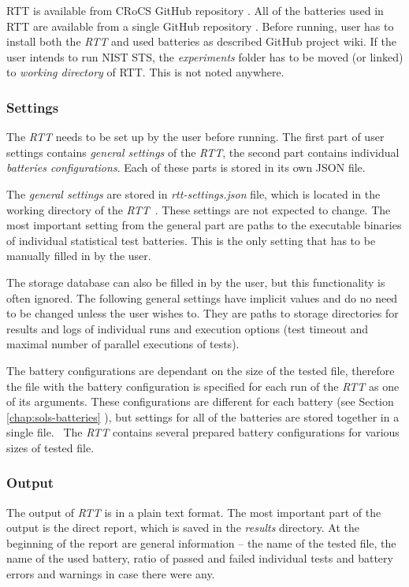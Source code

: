 \documentclass[
  digital,     %
  oneside,     %
  nosansbold,  %
  nocolorbold, %
  nolof,         %
  nolot,         %
]{fithesis4}
\begin{document}
RTT is available from CRoCS GitHub repository \cite{rtt-site}. All of the batteries used in RTT are available from a single GitHub repository \cite{rtt-batteries}. Before running, user has to install both the \emph{RTT} and used batteries as described GitHub project wiki. If the user intends to run NIST STS, the \emph{experiments} folder has to be moved (or linked) to \emph{working directory} of RTT. This is not noted anywhere.

\subsubsection{Settings}\label{rtt-settings} 
The \emph{RTT} needs to be set up by the user before running. The first part of user settings contains \emph{general settings} of the \emph{RTT}, the second part contains individual \emph{batteries configurations}. Each of these parts is stored in its own JSON file. 

The \emph{general settings} are stored in \emph{rtt-settings.json} file, which is located in the working directory of the \emph{RTT}~\cite[p.~10]{rtt-obratil}. These settings are not expected to change. The most important setting from the general part are paths to the executable binaries of individual statistical test batteries. This is the only setting that has to be manually filled in by the user.

The storage database can also be filled in by the user, but this functionality is often ignored. The following general settings have implicit values and do no need to be changed unless the user wishes to. They are paths to storage directories for results and logs of individual runs and execution options (test timeout and maximal number of parallel executions of tests). 

 The battery configurations are dependant on the size of the tested file, therefore the file with the battery configuration is specified for each run of the \emph{RTT} as one of its arguments. These configurations are different for each battery (see Section \ref{chap:sols-batteries} ), but settings for all of the batteries are stored together in a single file.~\cite[p.~11]{rtt-obratil}  The \emph{RTT} contains several prepared battery configurations for various sizes of tested file.

\subsubsection{Output}
The output of \emph{RTT} is in a plain text format. The most important part of the output is the direct report, which is saved in the \emph{results} directory. At the beginning of the report are general information -- the name of the tested file, the name of the used battery, ratio of passed and failed individual tests and battery errors and warnings in case there were any.
\end{document}
